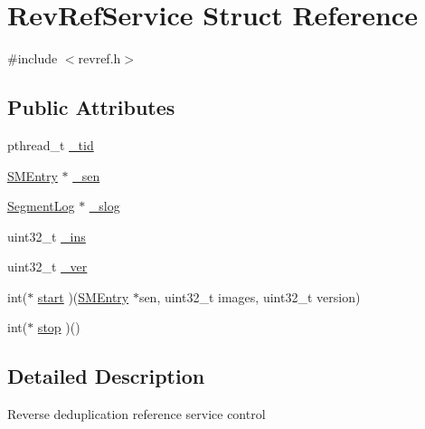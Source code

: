 \hypertarget{structRevRefService}{\section{\-Rev\-Ref\-Service \-Struct \-Reference}
\label{structRevRefService}
}


{\ttfamily \#include $<$revref.\-h$>$}

\subsection*{\-Public \-Attributes}
\begin{DoxyCompactItemize}
\item 
pthread\-\_\-t \hyperlink{structRevRefService_ae928af1a7099ab639bd37c36d7c2db38}{\-\_\-tid}
\item 
\hyperlink{structSMEntry}{\-S\-M\-Entry} $\ast$ \hyperlink{structRevRefService_a2f7fa7cd6def136f29d3b67a2374571c}{\-\_\-sen}
\item 
\hyperlink{structSegmentLog}{\-Segment\-Log} $\ast$ \hyperlink{structRevRefService_a80a2769c8d61455fa523cdbfd30632d1}{\-\_\-slog}
\item 
uint32\-\_\-t \hyperlink{structRevRefService_ac5640d7d1bdd4c98d81df91bb5acca1a}{\-\_\-ins}
\item 
uint32\-\_\-t \hyperlink{structRevRefService_a2ce0178a00f065768e68e0e45be7c044}{\-\_\-ver}
\item 
int($\ast$ \hyperlink{structRevRefService_afaa96302ed365ae54c9315bf393edb05}{start} )(\hyperlink{structSMEntry}{\-S\-M\-Entry} $\ast$sen, uint32\-\_\-t images, uint32\-\_\-t version)
\item 
int($\ast$ \hyperlink{structRevRefService_ac736cb6c2a9ef3d5e4d3e7977c6c2f4f}{stop} )()
\end{DoxyCompactItemize}


\subsection{\-Detailed \-Description}
\-Reverse deduplication reference service control 

